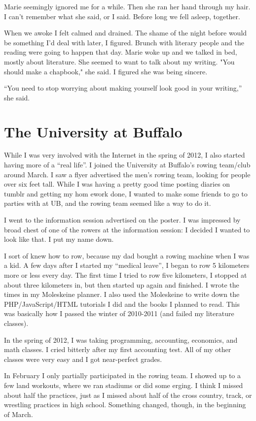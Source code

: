 \documentclass[12pt]{article}
\begin{document}
Marie seemingly ignored me for a while. Then she ran her hand through my hair.
I can't remember what she said, or I said.  Before long we fell asleep,
together.

When we awoke I felt calmed and drained.  The shame of the night before would be
something I'd deal with later, I figured.  Brunch with literary people and the
reading were going to happen that day.  Marie woke up and we talked in bed,
mostly about literature.  She seemed to want to talk about my writing.  "You
should make a chapbook," she said.  I figured she was being sincere.  

``You need to stop worrying about making yourself look good in your writing,'' she
said.

\section{The University at Buffalo}
While I was very involved with the Internet in the spring of 2012, I also
started having more of a ``real life''.  I joined the University at Buffalo's
rowing team/club around March.  I saw a flyer advertised the men's rowing team,
looking for people over six feet tall.  While I was having a pretty good time
posting diaries on tumblr and getting my hom ework done, I wanted to make some
friends to go to parties with at UB, and the  rowing team seemed like a way to do
it.  

I went to the information session advertised on the poster.  I was impressed by
 broad chest of one of the rowers at the information session: I decided I
wanted to look like that.  I put my name down.

I sort of knew how to row, because my dad bought a rowing machine when I was a
kid.  A few days after I started my ``medical leave'', I began to row 5
kilometers more or less every day.  The first time I tried to row five
kilometers, I stopped at about three kilometers in, but then started up again
and finished.  I wrote the times in my Moleskeine planner.  I also used the
Moleskeine to write down the PHP/JavaScript/HTML tutorials I did and the books
I planned to read.  This was basically how I passed the winter of 2010-2011
(and failed my literature classes).

In the spring of 2012, I was taking programming, accounting, economics, and
math classes.  I cried bitterly after my first accounting test.  All of my
other classes were very easy and I got near-perfect grades.

In February I only partially participated in the rowing team.  I showed up to a
few land workouts, where we ran stadiums or did some erging.  I think I
missed about half the practices, just as I missed about half of the cross
country, track, or wrestling practices in high school.  Something changed,
though, in the beginning of March.
\end{document}
